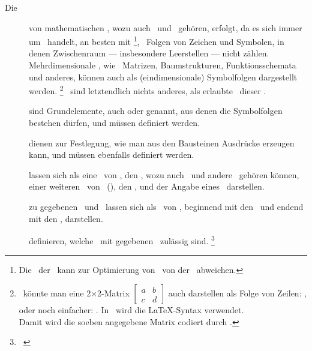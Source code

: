 \begin{description}
	\item[Die \logischeDarstellung] von mathematischen \Aussagen, wozu auch \Axiome\ und \Saetze\ gehören, erfolgt, da es sich immer um \Formeln\ handelt, an besten mit \Symbolfolgen%
	\footnote{%
		Die \interneDarstellung\ der \Symbolfolgen\ kann zur Optimierung von \ASBA\ von der \logischenD\ abweichen.
	},
	\textdh\ Folgen von Zeichen und Symbolen, in denen Zwischenraum --- insbesondere Leerstellen --- nicht zählen.
	Mehrdimensionale \Formeln, wie \textzB\ Matrizen, Baumstrukturen, Funktionsschemata und anderes, können auch als (eindimensionale) Symbolfolgen dargestellt werden.%
	\footnote{%
		\textZB\ könnte man eine 2$\times$2-Matrix
		$\begin{bmatrix} a & b \\ c & d \end{bmatrix}$
		auch darstellen als Folge von Zeilen: \seqqt{$[(a,b),(c,d)]$}, oder noch einfacher: \seqqt{$[a,b;c,d]$}.
		In \ASBA\ wird die \LaTeX-Syntax verwendet.
		\\Damit wird die soeben angegebene Matrix codiert durch .
	}
	\Beweise\ sind letztendlich nichts anderes, als erlaubte \Transformationen\ dieser \Symbolfolgen.
	\item[\Bausteine] sind Grundelemente, auch  oder  genannt, aus denen die Symbolfolgen bestehen dürfen, und müssen definiert werden.
	\item[\Formationsregeln] dienen zur Festlegung, wie man aus den Bausteinen Ausdrücke erzeugen kann, und müssen ebenfalls definiert werden.
	\item[\Saetze] lassen sich als eine \Menge\ von \Formeln, den \Praemissen, wozu auch \Axiome\ und andere \Saetze\ gehören können, einer weiteren \Menge\ von \Formeln\ (\Symbolfolgen), den \Konklusionen, und der Angabe eines \Beweises\ darstellen.
	\item[\Beweise] zu gegebenen \Praemissen\ und \Konklusionen\ lassen sich als \Folge\ von \Transformationen, beginnend mit den \Praemissen\ und endend mit den \Konklusionen, darstellen.
	\item[\Transformationsregeln] definieren, welche \Transformationen\ mit gegebenen \Formelmengen\ zulässig sind.%
	\footnote{\seename~\cite{bib:Rautenberg,bib:Schlussregel,bib:NatuerlichesSchliessen}}
\end{description}
\color{black}%

\Endchapter

